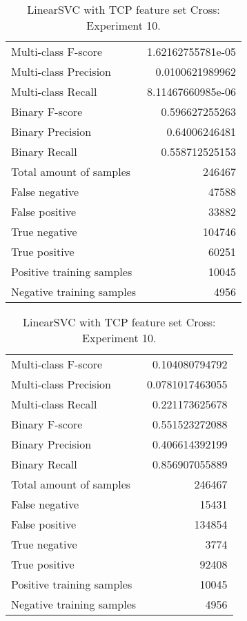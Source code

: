\begin{table}[H]
\begin{minipage}{0.5\textwidth}
\caption{LinearSVC with TCP feature set Cross: Experiment 9.}
\centering
\begin{tabular}{l r}
\toprule
Multi-class F-score & 1.62162755781e-05 \\
Multi-class Precision & 0.0100621989962 \\
Multi-class Recall & 8.11467660985e-06 \\
\midrule
Binary F-score & 0.596627255263 \\
Binary Precision & 0.64006246481 \\
Binary Recall & 0.558712525153 \\
\midrule
Total amount of samples & 246467 \\
False negative & 47588 \\
False positive & 33882 \\
True negative & 104746 \\
True positive & 60251 \\
\midrule
Positive training samples & 10045 \\
Negative training samples & 4956 \\
\bottomrule
\end{tabular}
\end{minipage}
\hfillx
\begin{minipage}{0.5\textwidth}
\caption{LinearSVC with TCP feature set Cross: Experiment 10.}
\centering
\begin{tabular}{l r}
\toprule
Multi-class F-score & 0.104080794792 \\
Multi-class Precision & 0.0781017463055 \\
Multi-class Recall & 0.221173625678 \\
\midrule
Binary F-score & 0.551523272088 \\
Binary Precision & 0.406614392199 \\
Binary Recall & 0.856907055889 \\
\midrule
Total amount of samples & 246467 \\
False negative & 15431 \\
False positive & 134854 \\
True negative & 3774 \\
True positive & 92408 \\
\midrule
Positive training samples & 10045 \\
Negative training samples & 4956 \\
\bottomrule
\end{tabular}
\end{minipage}
\end{table}
